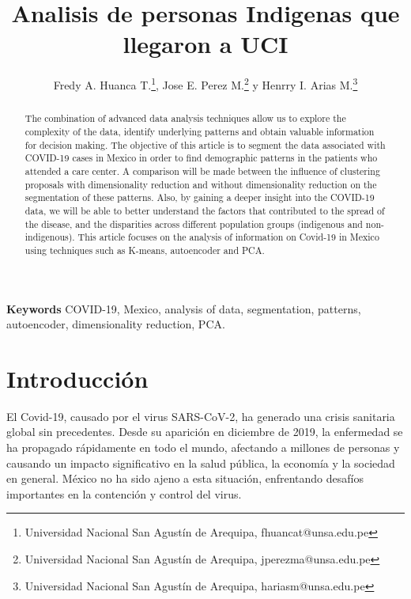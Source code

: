 \documentclass[a4paper,
               ]{jacow}
\newenvironment{keywords}
{\par\small\textbf{Keywords}}
{\par}
\begin{document}
\title{Analisis de personas Indigenas que llegaron a UCI}

\author{Fredy A. Huanca T.\thanks{Universidad Nacional San Agustín de Arequipa, fhuancat@unsa.edu.pe},
		Jose E. Perez M.\thanks{Universidad Nacional San Agustín de Arequipa, jperezma@unsa.edu.pe} y
		Henrry I. Arias M.\thanks{Universidad Nacional San Agustín de Arequipa, hariasm@unsa.edu.pe}}
	
\maketitle

%
\begin{abstract}
The combination of advanced data analysis techniques allow us to explore the complexity of the data, identify underlying patterns and obtain valuable information for decision making.
The objective of this article is to segment the data associated with COVID-19 cases in Mexico in order to find demographic patterns in the patients who attended a care center.
A comparison will be made between the influence of clustering proposals with dimensionality reduction and without dimensionality reduction on the segmentation of these patterns.
Also, by gaining a deeper insight into the COVID-19 data, we will be able to better understand the factors that contributed to the spread of the disease, and the disparities across different population groups (indigenous and non-indigenous).
This article focuses on the analysis of information on Covid-19 in Mexico using techniques such as K-means, autoencoder and PCA.
\end{abstract}

\begin{keywords}
COVID-19, Mexico, analysis of data, segmentation, patterns, autoencoder, dimensionality reduction, PCA.
\end{keywords}

\section{Introducción}

El Covid-19, causado por el virus SARS-CoV-2, ha generado una crisis sanitaria global sin precedentes. Desde su aparición en diciembre de 2019, la enfermedad se ha propagado rápidamente en todo el mundo, afectando a millones de personas y causando un impacto significativo en la salud pública, la economía y la sociedad en general. México no ha sido ajeno a esta situación, enfrentando desafíos importantes en la contención y control del virus.
\end{document}
